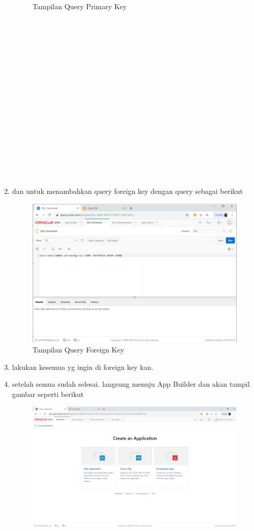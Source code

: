 \documentclass{article}
\begin{document}
\begin{enumerate}
\begin{figure}[h]
		\caption{Tampilan Query Primary Key}
\end{figure}
  \\
\\
\\
\\
\\
\\
\\
\\
\\
\\
\\
\\
\\
\\
\\
\\
	\item dan untuk menambahkan query foreign key dengan query sebagai berikut
	\begin{figure}[h]
	\centering
		\includegraphics[scale=0.5]{gambar/10.PNG}
		\caption{Tampilan Query Foreign Key}
\end{figure}
	\item lakukan kesemua yg ingin di foreign key kan.
	\item setelah semua sudah selesai. langsung menuju App Builder dan akan tampil gambar seperti berikut
	\begin{figure}[h]
	\centering
		\includegraphics[scale=0.5]{gambar/11.PNG}

\end{figure}
\end{enumerate}
\end{document}
